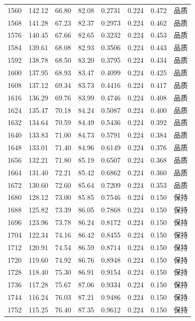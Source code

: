 \begin{longtable}{rrrrrrrr}
1560 & 142.12 & 66.80 & 82.08 & 0.2731 & 0.224 & 0.472 & 品质 \\
1568 & 141.28 & 67.23 & 82.37 & 0.2973 & 0.224 & 0.462 & 品质 \\
1576 & 140.45 & 67.66 & 82.65 & 0.3232 & 0.224 & 0.453 & 品质 \\
1584 & 139.61 & 68.08 & 82.93 & 0.3506 & 0.224 & 0.443 & 品质 \\
1592 & 138.78 & 68.50 & 83.20 & 0.3795 & 0.224 & 0.434 & 品质 \\
1600 & 137.95 & 68.93 & 83.47 & 0.4099 & 0.224 & 0.425 & 品质 \\
1608 & 137.12 & 69.34 & 83.73 & 0.4416 & 0.224 & 0.417 & 品质 \\
1616 & 136.29 & 69.76 & 83.99 & 0.4746 & 0.224 & 0.408 & 品质 \\
1624 & 135.47 & 70.18 & 84.24 & 0.5087 & 0.224 & 0.400 & 品质 \\
1632 & 134.64 & 70.59 & 84.49 & 0.5436 & 0.224 & 0.392 & 品质 \\
1640 & 133.83 & 71.00 & 84.73 & 0.5791 & 0.224 & 0.384 & 品质 \\
1648 & 133.01 & 71.40 & 84.96 & 0.6149 & 0.224 & 0.376 & 品质 \\
1656 & 132.21 & 71.80 & 85.19 & 0.6507 & 0.224 & 0.368 & 品质 \\
1664 & 131.40 & 72.21 & 85.42 & 0.6862 & 0.224 & 0.360 & 品质 \\
1672 & 130.60 & 72.60 & 85.64 & 0.7209 & 0.224 & 0.353 & 品质 \\
1680 & 128.12 & 73.00 & 85.85 & 0.7546 & 0.224 & 0.150 & 保持 \\
1688 & 125.82 & 73.39 & 86.05 & 0.7868 & 0.224 & 0.150 & 保持 \\
1696 & 123.96 & 73.78 & 86.24 & 0.8172 & 0.224 & 0.150 & 保持 \\
1704 & 122.34 & 74.16 & 86.42 & 0.8455 & 0.224 & 0.150 & 保持 \\
1712 & 120.91 & 74.54 & 86.59 & 0.8714 & 0.224 & 0.150 & 保持 \\
1720 & 119.60 & 74.92 & 86.76 & 0.8948 & 0.224 & 0.150 & 保持 \\
1728 & 118.40 & 75.30 & 86.91 & 0.9154 & 0.224 & 0.150 & 保持 \\
1736 & 117.28 & 75.67 & 87.06 & 0.9334 & 0.224 & 0.150 & 保持 \\
1744 & 116.24 & 76.03 & 87.21 & 0.9486 & 0.224 & 0.150 & 保持 \\
1752 & 115.25 & 76.40 & 87.35 & 0.9612 & 0.224 & 0.150 & 保持 \\

\end{longtable}
